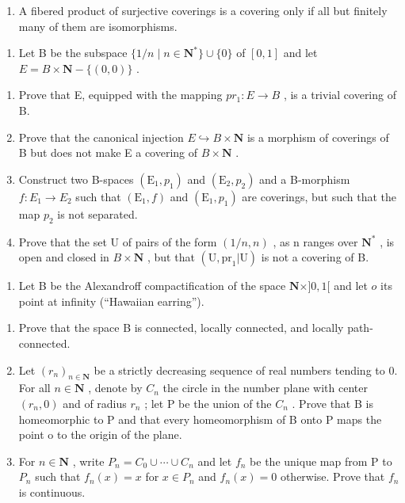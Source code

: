 \begin{enumerate}
\def\labelenumi{\alph{enumi})}
\setcounter{enumi}{1}
\tightlist
\item
  A fibered product of surjective coverings is a covering only if all but finitely many of them are isomorphisms.
\end{enumerate}

\begin{enumerate}
\def\labelenumi{\arabic{enumi})}
\setcounter{enumi}{3}
\tightlist
\item
  Let B be the subspace \(\{1/n \mid n \in \mathbf{N}^*\} \cup \{0\}\) of \([0,1]\) and let \(E = B \times \mathbf{N} - \{(0,0)\}\) .
\end{enumerate}

\begin{enumerate}
\def\labelenumi{\alph{enumi})}
\item
  Prove that E, equipped with the mapping \(pr_{1}: E \to B\) , is a trivial covering of B.
\item
  Prove that the canonical injection \(E \hookrightarrow B \times \mathbf{N}\) is a morphism of coverings of B but does not make E a covering of \(B \times \mathbf{N}\) .
\item
  Construct two B-spaces \((\mathrm{E}_{1}, p_{1})\) and \((\mathrm{E}_{2}, p_{2})\) and a B-morphism \(f: E_{1} \to E_{2}\) such that \((\mathrm{E}_{1}, f)\) and \((\mathrm{E}_{1}, p_{1})\) are coverings, but such that the map \(p_{2}\) is not separated.
\item
  Prove that the set U of pairs of the form \((1/n,n)\) , as n ranges over \(\mathbf{N}^{*}\) , is open and closed in \(B \times \mathbf{N}\) , but that \((\mathrm{U},\mathrm{pr}_{1}|\mathrm{U})\) is not a covering of B.
\end{enumerate}

\begin{enumerate}
\def\labelenumi{\arabic{enumi})}
\setcounter{enumi}{4}
\tightlist
\item
  Let B be the Alexandroff compactification of the space \(\mathbf{N} \times ]0,1[\) and let \(o\) its point at infinity (“Hawaiian earring”).
\end{enumerate}

\begin{enumerate}
\def\labelenumi{\alph{enumi})}
\item
  Prove that the space B is connected, locally connected, and locally path-connected.
\item
  Let \((r_{n})_{n\in\mathbf{N}}\) be a strictly decreasing sequence of real numbers tending to 0. For all \(n\in\mathbf{N}\) , denote by \(C_{n}\) the circle in the number plane with center \((r_{n},0)\) and of radius \(r_{n}\) ; let P be the union of the \(C_{n}\) . Prove that B is homeomorphic to P and that every homeomorphism of B onto P maps the point o to the origin of the plane.
\item
  For \(n \in \mathbf{N}\) , write \(P_{n} = C_{0} \cup \cdots \cup C_{n}\) and let \(f_{n}\) be the unique map from P to \(P_{n}\) such that \(f_{n}(x) = x\) for \(x \in P_{n}\) and \(f_{n}(x) = 0\) otherwise. Prove that \(f_{n}\) is continuous.
\end{enumerate}

